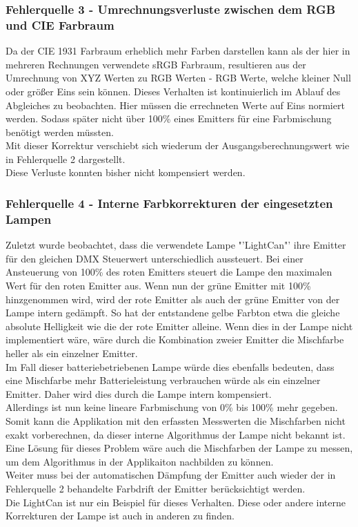 \documentclass[11pt]{scrartcl}
\begin{document}
\subsubsection{Fehlerquelle 3 - Umrechnungsverluste zwischen dem RGB und CIE Farbraum}
Da der CIE 1931 Farbraum erheblich mehr Farben darstellen kann als der hier in mehreren Rechnungen verwendete sRGB Farbraum,
resultieren aus der Umrechnung von XYZ Werten zu RGB Werten - RGB Werte, welche kleiner Null oder größer Eins sein können.
Dieses Verhalten ist kontinuierlich im Ablauf des Abgleiches zu beobachten. Hier müssen die errechneten Werte auf Eins
normiert werden. Sodass später nicht über 100\% eines Emitters für eine Farbmischung benötigt werden müssten.\\
Mit dieser Korrektur verschiebt sich wiederum der Ausgangsberechnungswert wie in Fehlerquelle 2 dargestellt.\\
Diese Verluste konnten bisher nicht kompensiert werden.
\subsubsection{Fehlerquelle 4 - Interne Farbkorrekturen der eingesetzten Lampen}
Zuletzt wurde beobachtet, dass die verwendete Lampe "'LightCan"' ihre Emitter für den gleichen DMX
Steuerwert unterschiedlich aussteuert. Bei einer Ansteuerung von 100\% des roten Emitters steuert die Lampe den
maximalen Wert für den roten Emitter aus. Wenn nun der grüne Emitter mit 100\% hinzgenommen wird, wird der rote Emitter
als auch der grüne Emitter von der Lampe intern gedämpft. So hat der entstandene gelbe Farbton etwa die gleiche absolute
Helligkeit wie die der rote Emitter alleine. Wenn dies in der Lampe nicht implementiert wäre, wäre durch die Kombination zweier
Emitter die Mischfarbe heller als ein einzelner Emitter.\\
Im Fall dieser batteriebetriebenen Lampe würde dies ebenfalls bedeuten, dass eine Mischfarbe mehr Batterieleistung verbrauchen
würde als ein einzelner Emitter. Daher wird dies durch die Lampe intern kompensiert.\\
Allerdings ist nun keine lineare Farbmischung von 0\% bis 100\% mehr gegeben. Somit kann die Applikation mit den erfassten
Messwerten die Mischfarben nicht exakt vorberechnen, da dieser interne Algorithmus der Lampe nicht bekannt ist.\\
Eine Lösung für dieses Problem wäre auch die Mischfarben der Lampe zu messen, um dem Algorithmus in der Applikaiton nachbilden
zu können.\\
Weiter muss bei der automatischen Dämpfung der Emitter auch wieder der in Fehlerquelle 2 behandelte Farbdrift der Emitter
berücksichtigt werden.\\
Die LightCan ist nur ein Beispiel für dieses Verhalten. Diese oder andere interne Korrekturen der Lampe ist auch in anderen
zu finden.
\clearpage
\end{document}
